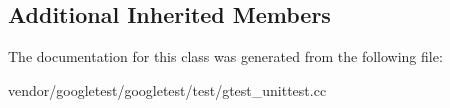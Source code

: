 \subsection*{Additional Inherited Members}


The documentation for this class was generated from the following file\+:\begin{DoxyCompactItemize}
\item 
vendor/googletest/googletest/test/gtest\+\_\+unittest.\+cc\end{DoxyCompactItemize}

